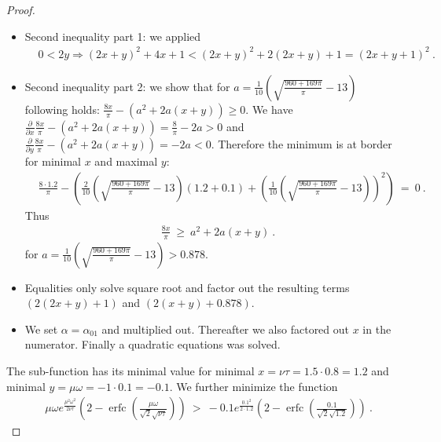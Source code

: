 \documentclass{article}
\renewcommand{\geq}{\geqslant}
\DeclareMathOperator{\erfc}{erfc}
\begin{document}
\begin{proof}
\begin{itemize}
\item Second inequality part 1: we applied
\begin{align}
& 0<2 y\Longrightarrow (2 x+y)^2+4 x+1<(2 x+y)^2+2 (2 x+y)+1=(2 x+y+1)^2 \ .
\end{align}
\item Second inequality part 2: we show that for $a=\frac{1}{10} \left(\sqrt{\frac{960+169 \pi }{\pi }}-13\right)$ following holds:
$\frac{8 x}{\pi }-\left(a^2+2 a (x+y)\right) \geq 0$. 
We have $\frac{\partial }{\partial x }\frac{8 x}{\pi }-\left(a^2+2 a
  (x+y)\right)=\frac{8}{\pi }-2 a>0$ and
 $\frac{\partial }{\partial y }\frac{8 x}{\pi }-\left(a^2+2 a
  (x+y)\right)=-2 a<0$. 
Therefore the minimum is at border for minimal $x$ and maximal $y$:
\begin{align}
& \frac{8 \cdot 1.2}{\pi }-\left(\frac{2}{10} \left(\sqrt{\frac{960+169 \pi }{\pi }}-13\right) (1.2+0.1)+\left(\frac{1}{10} \left(\sqrt{\frac{960+169 \pi }{\pi }}-13\right)\right)^2\right) \
  = \ 0 \ .
\end{align}
Thus
\begin{align}
& \frac{8 x}{\pi } \ \geq \ a^2+2 a (x+y) \ .
\end{align}
for $a=\frac{1}{10} \left(\sqrt{\frac{960+169 \pi }{\pi }}-13\right) > 0.878$.

\item Equalities only solve square root and factor out the resulting
  terms $(2(2 x+y)+1)$ and $(2(x+y)+0.878)$.

\item We set $\alpha=\alpha_{01}$ and multiplied out. Thereafter we
  also factored out $x$ in the numerator. Finally a quadratic
  equations was solved. 
\end{itemize}

The sub-function has its minimal value for 
minimal
$x=\nu\tau=1.5 \cdot 0.8=1.2$ and  minimal 
$y=\mu \omega=-1 \cdot 0.1=-0.1$. 
We further minimize the function
\begin{align}
& \mu \omega e^{\frac{\mu^2 \omega^2}{2 \nu \tau}}
  \left(2-\erfc\left(\frac{\mu \omega}{\sqrt{2} \sqrt{\nu
  \tau}}\right)\right) \ > \ -0.1 e^{\frac{0.1^2}{2 \cdot 1.2}}
  \left(2-\erfc\left(\frac{0.1}{\sqrt{2}
  \sqrt{1.2}}\right)\right) \ .
\end{align}



\end{proof}
\end{document}
